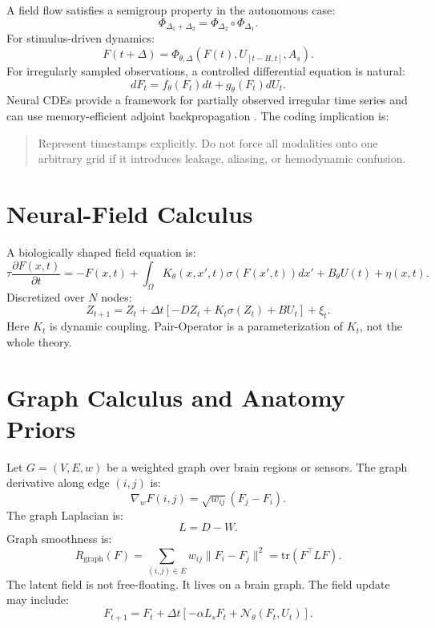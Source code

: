 \documentclass[11pt]{article}
\newcommand{\tr}{\mathrm{tr}}
\begin{document}
A field flow satisfies a semigroup property in the autonomous case:
\begin{equation}
\Phi_{\Delta_1+\Delta_2}=\Phi_{\Delta_2}\circ \Phi_{\Delta_1}.
\end{equation}
For stimulus-driven dynamics:
\begin{equation}
F(t+\Delta)=\Phi_{\theta,\Delta}\left(F(t),U_{[t-H,t]},A_s\right).
\end{equation}
For irregularly sampled observations, a controlled differential equation is natural:
\begin{equation}
dF_t = f_\theta(F_t)dt + g_\theta(F_t)dU_t.
\end{equation}
Neural CDEs provide a framework for partially observed irregular time series and can use memory-efficient adjoint backpropagation \cite{neuralcde}. The coding implication is:
\begin{quote}
Represent timestamps explicitly. Do not force all modalities onto one arbitrary grid if it introduces leakage, aliasing, or hemodynamic confusion.
\end{quote}

\section{Neural-Field Calculus}

A biologically shaped field equation is:
\begin{equation}
\tau \frac{\partial F(x,t)}{\partial t}
= -F(x,t)+\int_\Omega K_\theta(x,x',t)\sigma(F(x',t))dx' + B_\theta U(t)+\eta(x,t).
\end{equation}
Discretized over $N$ nodes:
\begin{equation}
Z_{t+1}=Z_t+\Delta t\left[-DZ_t+K_t\sigma(Z_t)+BU_t\right]+\xi_t.
\end{equation}
Here $K_t$ is dynamic coupling. Pair-Operator is a parameterization of $K_t$, not the whole theory.

\section{Graph Calculus and Anatomy Priors}

Let $G=(V,E,w)$ be a weighted graph over brain regions or sensors. The graph derivative along edge $(i,j)$ is:
\begin{equation}
\nabla_w F(i,j)=\sqrt{w_{ij}}(F_j-F_i).
\end{equation}
The graph Laplacian is:
\begin{equation}
L=D-W.
\end{equation}
Graph smoothness is:
\begin{equation}
R_{\mathrm{graph}}(F)=\sum_{(i,j)\in E}w_{ij}\|F_i-F_j\|^2=\tr(F^\top L F).
\end{equation}
The latent field is not free-floating. It lives on a brain graph. The field update may include:
\begin{equation}
F_{t+1}=F_t+\Delta t\left[-\alpha L_sF_t+\mathcal{N}_\theta(F_t,U_t)\right].
\end{equation}
\end{document}
